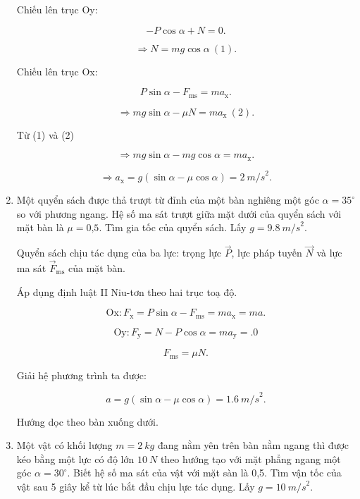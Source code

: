 \begin{enumerate}[label=\bfseries Câu \arabic*:]
{	Chiếu lên trục Oy: 
	
	$$- P\cos \alpha + N = 0.$$
	
	$$\Rightarrow  N =mg \cos \alpha\ (1).$$
	
	Chiếu lên trục Ox: 
	
	$$P \sin \alpha - F_\text{ms} = ma_\text{x}.$$
	
	$$\Rightarrow  mg\sin \alpha  - \mu N = ma_\text{x}\  (2).$$
	
	Từ (1) và (2) 
	
	$$\Rightarrow mg\sin \alpha - mg \cos \alpha = ma_\text{x}.$$
	
	$$\Rightarrow a_\text{x} = g(\sin \alpha - \mu \cos \alpha) = \SI{2}{m/s}^2.$$
	}
	\item {}
	
	
	{
		Một quyển sách được thả trượt từ đỉnh của một bàn nghiêng một góc $\alpha = 35^\circ$ so với phương ngang. Hệ số ma sát trượt giữa mặt dưới của quyển sách với mặt bàn là $\mu = \text{0,5}$. Tìm gia tốc của quyển sách. Lấy $g = \SI{9,8}{m/s}^2$.
	}
	
	\hideall
	{
		Quyển sách chịu tác dụng của ba lực: trọng lực $\vec P$, lực pháp tuyến $\vec N$ và lực ma sát $\vec F_\text{ms}$ của mặt bàn.
		
		Áp dụng định luật II Niu-tơn theo hai trục toạ độ.
		
		$$\text{Ox}: F_\text{x} = P \sin \alpha - F_\text{ms} = ma_\text{x} = ma.$$
		
		$$\text{Oy}: F_\text{y} = N - P \cos \alpha = ma_\text{y} = .0$$
		
		$$F_\text{ms} = \mu N.$$
		
		Giải hệ phương trình ta được:
		
		$$a = g(\sin \alpha - \mu \cos \alpha) = \SI{1,6}{m/s}^2.$$
		
		Hướng dọc theo bàn xuống dưới.
	}
	\item {}
	
	
	{
		Một vật có khối lượng $m= \SI{2}{kg}$ đang nằm yên trên bàn nằm ngang thì được kéo bằng một lực có độ lớn $\SI{10}{N}$ theo hướng tạo với mặt phẳng ngang một góc $\alpha = 30^\circ$. Biết hệ số ma sát của vật với mặt sàn là 0,5. Tìm vận tốc của vật sau 5 giây kể từ lúc bắt đầu chịu lực tác dụng. Lấy $g = \SI{10}{m/s}^2.$
	}
	

\end{enumerate}
